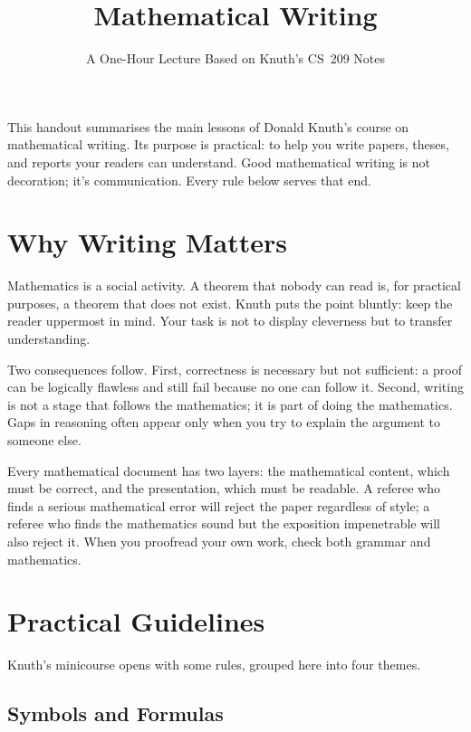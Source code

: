 \documentclass[11pt]{article}
\title{Mathematical Writing}
\author{A One-Hour Lecture Based on Knuth's CS~209 Notes}
\date{}
\begin{document}
\maketitle

\noindent
This handout summarises the main lessons of Donald Knuth's course on mathematical writing. Its purpose is practical: to help you write papers, theses, and reports your readers can understand. Good mathematical writing is not decoration; it's communication. Every rule below serves that end.

\section{Why Writing Matters}

Mathematics is a social activity. A theorem that nobody can read is, for practical purposes, a theorem that does not exist. Knuth puts the point bluntly: keep the reader uppermost in mind. Your task is not to display cleverness but to transfer understanding.

Two consequences follow. First, correctness is necessary but not sufficient: a proof can be logically flawless and still fail because no one can follow it. Second, writing is not a stage that follows the mathematics; it is part of doing the mathematics. Gaps in reasoning often appear only when you try to explain the argument to someone else.

Every mathematical document has two layers: the mathematical content, which must be correct, and the presentation, which must be readable. A referee who finds a serious mathematical error will reject the paper regardless of style; a referee who finds the mathematics sound but the exposition impenetrable will also reject it. When you proofread your own work, check both grammar and mathematics.

\section{Practical Guidelines}

Knuth's minicourse opens with some rules, grouped here into four themes.

\subsection{Symbols and Formulas}
\end{document}
